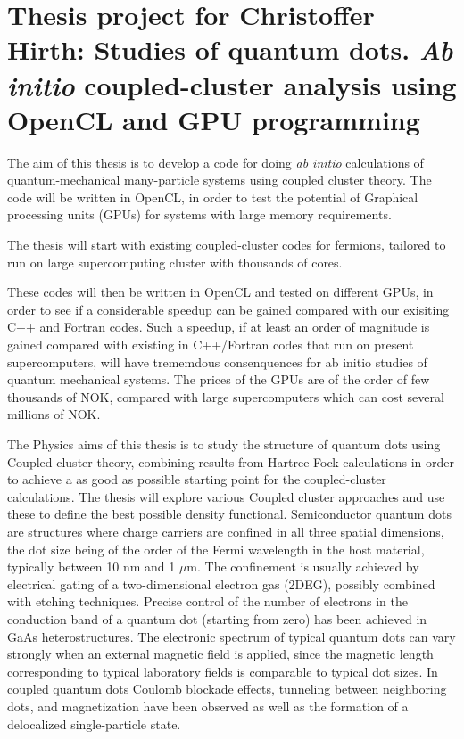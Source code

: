 


\pagestyle{plain}


\section*{Thesis project for Christoffer Hirth: Studies of quantum dots. {\em Ab initio} coupled-cluster analysis using OpenCL and GPU programming}

The aim of this thesis is to develop  a code for doing {\em ab initio} calculations of quantum-mechanical many-particle systems using coupled cluster theory.
The code will be 
written in OpenCL, in order to test the potential
of Graphical processing units (GPUs) for systems with large memory requirements.

The thesis will start with existing coupled-cluster  
codes for fermions,
tailored to run on large supercomputing cluster with thousands of cores.

These codes will then be written in OpenCL and tested on different GPUs,
in order to see if a considerable speedup can be gained compared with our exisiting C++ and Fortran codes.
Such a speedup, if at least an order of magnitude is gained compared 
with existing in C++/Fortran codes that run on present  supercomputers, will have trememdous consenquences for ab initio studies of quantum mechanical systems.  The prices of the GPUs are of the order of few thousands of NOK, compared
with large supercomputers which can cost several millions of NOK. 

The Physics aims of this thesis is to study the structure of quantum dots using
Coupled cluster theory, combining results
from Hartree-Fock calculations in order to achieve a as good as possible
starting point for the coupled-cluster calculations. 
The thesis will explore various Coupled cluster
approaches and use these to define the best possible density functional.
Semiconductor quantum dots are structures where
charge carriers are confined in all three spatial dimensions, 
the dot size being of the order of the Fermi wavelength 
in the host material, typically between  10 nm and  1 $\mu$m.
The confinement is usually achieved by electrical gating of a 
two-dimensional electron gas (2DEG), 
possibly combined with etching techniques. Precise control of the
number of electrons in the conduction band of a quantum dot 
(starting from zero) has been achieved in GaAs heterostructures. 
The electronic spectrum of typical quantum dots
can vary strongly when an external magnetic field is applied, 
since the magnetic length corresponding to typical 
laboratory fields  is comparable to typical dot sizes.
In coupled quantum dots Coulomb blockade effects, 
tunneling between neighboring dots, and magnetization 
have been observed as well as the formation of a
delocalized single-particle state. 


